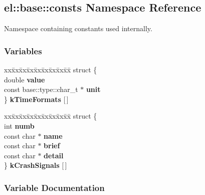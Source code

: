 \hypertarget{a00185}{}\subsection{el\+:\+:base\+:\+:consts Namespace Reference}
\label{a00185}


Namespace containing constants used internally.  


\subsubsection*{Variables}
\begin{DoxyCompactItemize}
\item 
\begin{tabbing}
xx\=xx\=xx\=xx\=xx\=xx\=xx\=xx\=xx\=\kill
struct \{\\
\>double {\bfseries value}\\
\>const base::type::char\_t $\ast$ {\bfseries unit}\\
\} {\bfseries kTimeFormats} \mbox{[}$\,$\mbox{]}\\

\end{tabbing}\item 
\begin{tabbing}
xx\=xx\=xx\=xx\=xx\=xx\=xx\=xx\=xx\=\kill
struct \{\\
\>int {\bfseries numb}\\
\>const char $\ast$ {\bfseries name}\\
\>const char $\ast$ {\bfseries brief}\\
\>const char $\ast$ {\bfseries detail}\\
\} {\bfseries kCrashSignals} \mbox{[}$\,$\mbox{]}\\

\end{tabbing}\end{DoxyCompactItemize}


\subsubsection{Variable Documentation}
\hypertarget{a00185_ae148ad63452cb04651a6abe4f6b3f39c}{}
